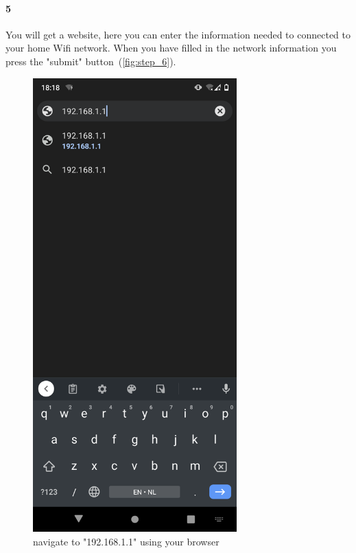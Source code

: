 \documentclass[11pt]{article}
\begin{document}
    \paragraph{5} You will get a website, here you can enter the information needed to connected to your home Wifi network.
    When you have filled in the network information you press the "submit" button~(\textcolor{blue}{\ref{fig:step_6}}).
    \begin{figure}[H]
        \centering
        \begin{minipage}{0.45\textwidth}
            \centering
            \includegraphics[width=0.7\textwidth]{step_5}
            \caption{navigate to "192.168.1.1" using your browser}
            \label{fig:step_5}
        \end{minipage}\hfill

\end{figure}
\end{document}
